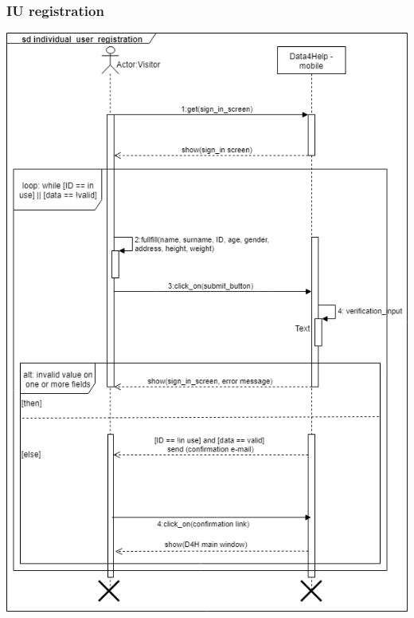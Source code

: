 \subsubsection{IU registration}
\includegraphics[scale = 0.5]{sections/requirements/sequenceDiagrams/individual_user_registration.png}
\clearpage
